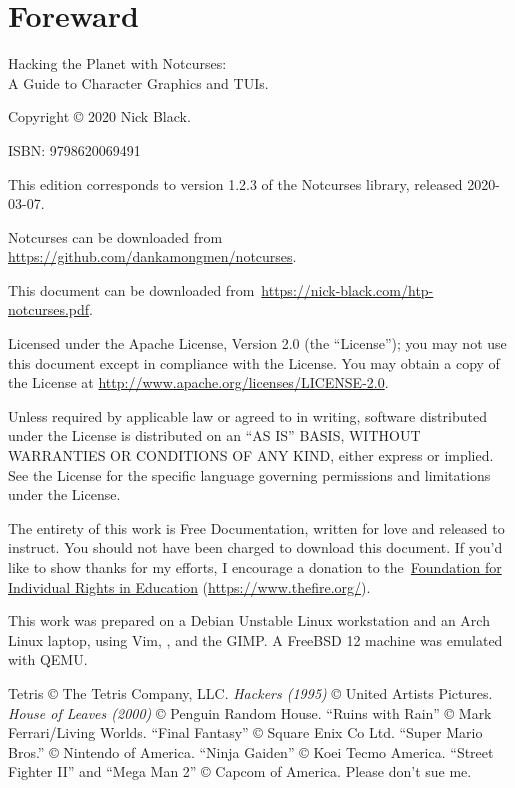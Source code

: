 \documentclass[letterpaper,10pt]{article}
\begin{document}
\cleardoublepage
{}
{}
\listoffigures
{}
\listoflistings
{}
\listoftables
\clearpage

\cleardoublepage
\section*{Foreward}
Hacking the Planet with Notcurses:\\
A Guide to Character Graphics and TUIs.

Copyright © 2020 Nick Black.

ISBN: 9798620069491

This edition corresponds to version 1.2.3 of the Notcurses
library, released 2020-03-07.

Notcurses can be downloaded from
\url{https://github.com/dankamongmen/notcurses}.

This document can be downloaded
from~\url{https://nick-black.com/htp-notcurses.pdf}.

Licensed under the Apache License, Version 2.0 (the ``License''); you may not
use this document except in compliance with the License. You may obtain a copy
of the License at \url{http://www.apache.org/licenses/LICENSE-2.0}.

Unless required by applicable law or agreed to in writing, software
distributed under the License is distributed on an ``AS IS'' BASIS,
WITHOUT WARRANTIES OR CONDITIONS OF ANY KIND, either express or implied.
See the License for the specific language governing permissions and
limitations under the License.

The entirety of this work is Free Documentation, written for love and released
to instruct. You should not have been charged to download this document. If
you'd like to show thanks for my efforts, I encourage a donation to
the~\href{https://www.thefire.org/}{Foundation for Individual Rights in Education} (\url{https://www.thefire.org/}).

This work was prepared on a Debian Unstable Linux workstation and an Arch Linux laptop,
using Vim, \XeLaTeX, and the GIMP. A FreeBSD 12 machine was emulated with QEMU.

Tetris © The Tetris Company, LLC.
\textit{Hackers (1995)} © United Artists Pictures.
\textit{House of Leaves (2000)} © Penguin Random House.
``Ruins with Rain'' © Mark Ferrari/Living Worlds.
``Final Fantasy'' © Square Enix Co Ltd.
``Super Mario Bros.'' © Nintendo of America.
``Ninja Gaiden'' © Koei Tecmo America.
``Street Fighter II'' and ``Mega Man 2'' © Capcom of America.
Please don't sue me.
\end{document}
